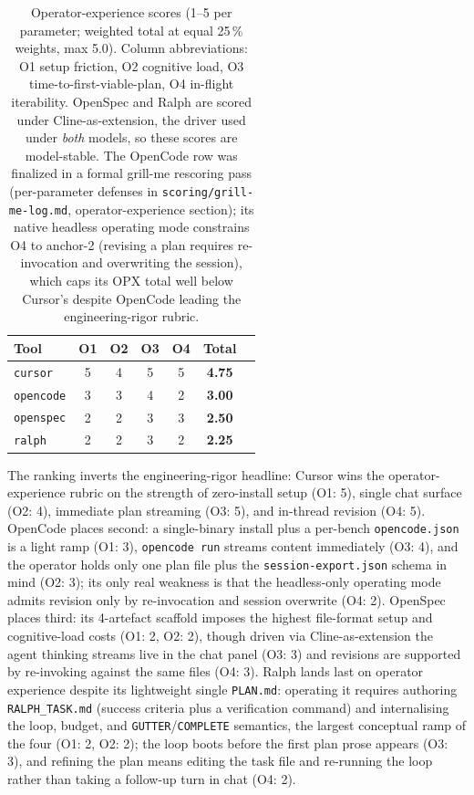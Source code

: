 \begin{table}[h]
\centering
\caption{Operator-experience scores (1--5 per parameter; weighted
total at equal 25\,\% weights, max 5.0). Column abbreviations: O1
setup friction, O2 cognitive load, O3 time-to-first-viable-plan, O4
in-flight iterability. OpenSpec and Ralph are scored under
Cline-as-extension, the driver used under \emph{both} models, so these
scores are model-stable. The OpenCode row was finalized in a formal
grill-me rescoring pass (per-parameter defenses in
\texttt{scoring/grill-me-log.md}, operator-experience section); its
native headless operating mode constrains O4 to anchor-2 (revising a
plan requires re-invocation and overwriting the session), which caps
its OPX total well below Cursor's despite OpenCode leading the
engineering-rigor rubric.}
\label{tab:opx-scores}
\begin{tabular}{lcccccr}
\toprule
Tool & O1 & O2 & O3 & O4 & Total \\
\midrule
\texttt{cursor}     & 5 & 4 & 5 & 5 & \textbf{4.75} \\
\texttt{opencode} & 3 & 3 & 4 & 2 & \textbf{3.00} \\
\texttt{openspec}   & 2 & 2 & 3 & 3 & \textbf{2.50} \\
\texttt{ralph}      & 2 & 2 & 3 & 2 & \textbf{2.25} \\
\bottomrule
\end{tabular}
\end{table}

The ranking inverts the engineering-rigor headline: Cursor wins
the operator-experience rubric on the strength of zero-install setup
(O1: 5), single chat surface (O2: 4), immediate plan streaming (O3:
5), and in-thread revision (O4: 5). OpenCode places second: a
single-binary install plus a per-bench \texttt{opencode.json} is a
light ramp (O1: 3), \texttt{opencode run} streams content immediately
(O3: 4), and the operator holds only one plan file plus the
\texttt{session-export.json} schema in mind (O2: 3); its only real
weakness is that the headless-only operating mode admits revision only
by re-invocation and session overwrite (O4: 2). OpenSpec places third:
its 4-artefact scaffold imposes the highest file-format setup and
cognitive-load costs (O1: 2, O2: 2), though driven via
Cline-as-extension the agent thinking streams live in the chat panel
(O3: 3) and revisions are supported by re-invoking against the same
files (O4: 3). Ralph lands last on operator experience despite its
lightweight single \texttt{PLAN.md}: operating it requires authoring
\texttt{RALPH\_TASK.md} (success criteria plus a verification command)
and internalising the loop, budget, and
\texttt{GUTTER}/\texttt{COMPLETE} semantics, the largest conceptual
ramp of the four (O1: 2, O2: 2); the loop boots before the first
plan prose appears (O3: 3), and refining the plan means editing the
task file and re-running the loop rather than taking a follow-up turn
in chat (O4: 2).
